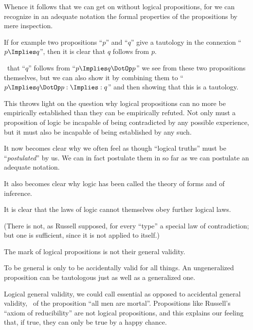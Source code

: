 {Whence it follows that we can get on without
logical propositions, for we can recognize in an
adequate notation the formal properties of the propositions
by mere inspection.}


{If for example two propositions ``$p$'' and ``$q$''
give a tautology in the connexion ``$p \Implies q$'', then
it is clear that $q$ follows from $p$.

\ExempliGratia\ that ``$q$'' follows from ``$p \Implies q \DotOp p$'' we see from
these two propositions themselves, but we can also
show it by combining them to ``$p \Implies q \DotOp p : \Implies : q$'' and
then showing that this is a tautology.}


{This throws light on the question why logical
propositions can no more be empirically established
than they can be empirically refuted. Not only
must a proposition of logic be incapable of being
contradicted by any possible experience, but it
must also be incapable of being established by any
such.}


{It now becomes clear why we often feel as though
``logical truths'' must be ``\emph{postulated}'' by us. We
can in fact postulate them in so far as we can
postulate an adequate notation.}


{It also becomes clear why logic has been called
the theory of forms and of inference.}


{It is clear that the laws of logic cannot themselves
obey further logical laws.

(There is not, as Russell supposed, for every
``type'' a special law of contradiction; but one is
sufficient, since it is not applied to itself.)}


{The mark of logical propositions is not their
general validity.

To be general is only to be accidentally valid
for all things. An ungeneralized proposition can
be tautologous just as well as a generalized
one.}


{Logical general validity, we could call essential
as opposed to accidental general validity, \exempliGratia\ of the
proposition ``all men are mortal''. Propositions
like Russell's ``axiom of reducibility'' are not
logical propositions, and this explains our feeling
that, if true, they can only be true by a happy
chance.}


